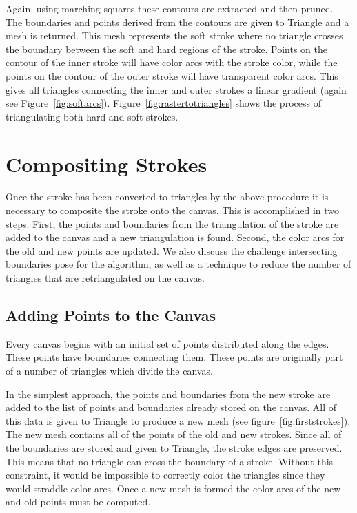 \documentclass[review]{acmsiggraph}
\begin{document}
Again, using marching squares these contours are extracted and then pruned. The boundaries and points
derived from the contours are given to Triangle and a mesh is returned. This mesh represents the soft
stroke where no triangle crosses the boundary between the soft and hard regions
of the stroke. Points on the contour of the inner stroke will have color arcs with the stroke color,
while the points on the contour of the outer stroke will have transparent color arcs. This gives
all triangles connecting the inner and outer strokes a linear gradient (again see Figure~\ref{fig:softarcs}).
Figure~\ref{fig:rastertotriangles} shows the process of triangulating both hard and soft strokes.


\section{Compositing Strokes}
Once the stroke has been converted to triangles by the above procedure it is necessary to
composite the stroke onto the canvas. This is accomplished in two steps. First, the points
and boundaries from the triangulation of the stroke are added to the canvas and a new
triangulation is found. Second, the color arcs for the old and new points are updated.
We also discuss the challenge intersecting boundaries pose for the algorithm, as well
as a technique to reduce the number of triangles that are retriangulated on the canvas.


\subsection{Adding Points to the Canvas}

Every canvas begins with an initial set of points distributed along the edges. These
points have boundaries connecting them. These points are originally part of a number of triangles which
divide the canvas.

In the simplest approach, the points and boundaries from the new stroke are added
to the list of points and boundaries already stored on the canvas. All of this data is given to Triangle
to produce a new mesh (see figure~\ref{fig:firststrokes}). The new mesh contains all of the points of the old and new strokes. Since
all of the boundaries are stored and given to Triangle, the stroke edges are preserved. This means that
no triangle can cross the boundary of a stroke. Without this constraint, it would be impossible to correctly color the
triangles since they would straddle color arcs. Once a new mesh is formed the color arcs of the 
new and old points must be computed.
\end{document}
